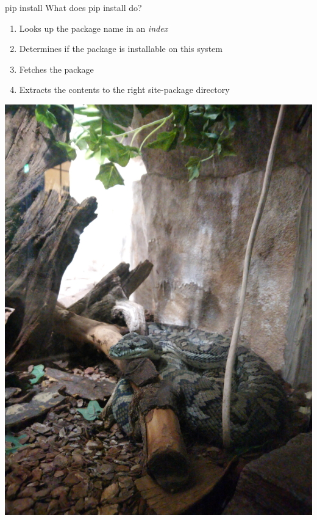 \documentclass[pdf]{beamer}
\begin{document}
\begin{frame}{pip install}
    What does pip install do?

    \begin{enumerate}
        \item Looks up the package name in an \emph{index}
        \item Determines if the package is installable on this system
        \item Fetches the package
        \item Extracts the contents to the right site-package directory
    \end{enumerate}
\end{frame}

\begin{frame}
    \begin{center}
    \includegraphics[keepaspectratio, height = 0.9\textheight]{snake.jpg}
    \end{center}
\end{frame}
\end{document}

